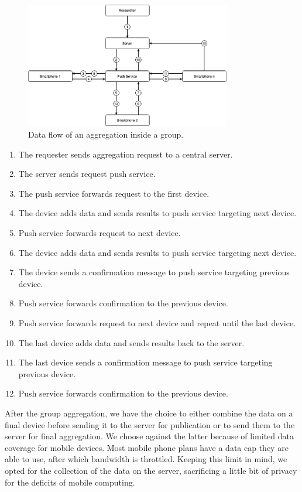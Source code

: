 \begin{figure}[htbp]
  \centering
  \includegraphics[width=0.8\textwidth]{figures/ar2}
  \caption{Data flow of an aggregation inside a group.} \label{fig:ar2}
\end{figure}

\begin{enumerate}
    \item The requester sends aggregation request to a central server.
    \item The server sends request push service.
    \item The push service forwards request to the first device.
    \item The device adds data and sends results to push service targeting next device.
    \item Push service forwards request to next device.
    \item The device adds data and sends results to push service targeting next device.
    \item The device sends a confirmation message to push service targeting previous device.
    \item Push service forwards confirmation to the previous device.
    \item Push service forwards request to next device and repeat until the last device.
    \item The last device adds data and sends results back to the server.
    \item The last device sends a confirmation message to push service targeting previous device.
    \item Push service forwards confirmation to the previous device.
\end{enumerate}

After the group aggregation, we have the choice to either combine the data on a final device before sending it to the server for publication or to send them to the server for final aggregation. We choose against the latter because of limited data coverage for mobile devices. Most mobile phone plans have a data cap they are able to use, after which bandwidth is throttled. Keeping this limit in mind, we opted for the collection of the data on the server, sacrificing a little bit of privacy for the deficits of mobile computing.

